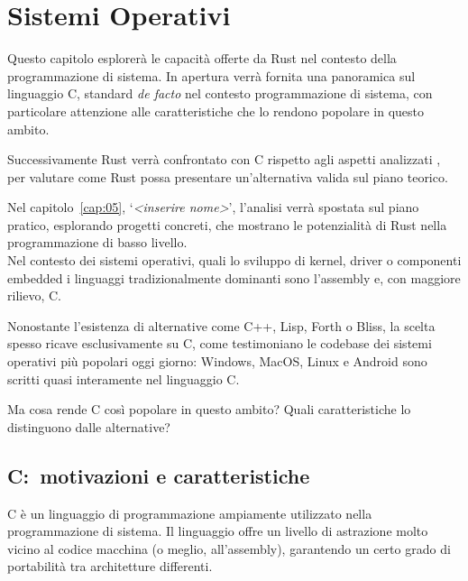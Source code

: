 
\chapter{Sistemi Operativi}\label{cap:04}

Questo capitolo esplorerà le capacità offerte da Rust nel 
contesto della programmazione di sistema. In apertura verrà
fornita una panoramica sul linguaggio C, standard \textit{de facto}
nel contesto programmazione di sistema, con particolare attenzione alle 
 caratteristiche che lo rendono popolare in questo ambito.

Successivamente Rust verrà confrontato con C rispetto agli aspetti analizzati
, per valutare come Rust possa presentare un'alternativa valida sul piano teorico.

Nel capitolo~\ref{cap:05}, `\textit{<inserire nome>}', l'analisi verrà spostata sul piano pratico, 
esplorando progetti concreti, che mostrano le potenzialità di Rust nella programmazione di basso livello. \hfill
\vspace{20pt}\\
\noindent Nel contesto dei sistemi operativi, quali lo sviluppo di kernel, driver o componenti embedded i linguaggi tradizionalmente dominanti
 sono l'assembly e, con maggiore rilievo, C.

Nonostante l'esistenza di alternative come C++, Lisp, Forth o Bliss, la scelta spesso ricave esclusivamente
su C, come testimoniano le codebase dei sistemi operativi più popolari oggi giorno: Windows, MacOS, Linux e Android sono scritti quasi interamente nel linguaggio C.

Ma cosa rende C così popolare in questo ambito? Quali caratteristiche lo distinguono dalle alternative?

\section{C:\  motivazioni e caratteristiche}
C è un linguaggio di programmazione ampiamente utilizzato nella 
programmazione di sistema. Il linguaggio offre un livello
di astrazione molto vicino al codice macchina (o meglio, 
all'assembly), garantendo un certo grado di portabilità 
tra architetture differenti.

